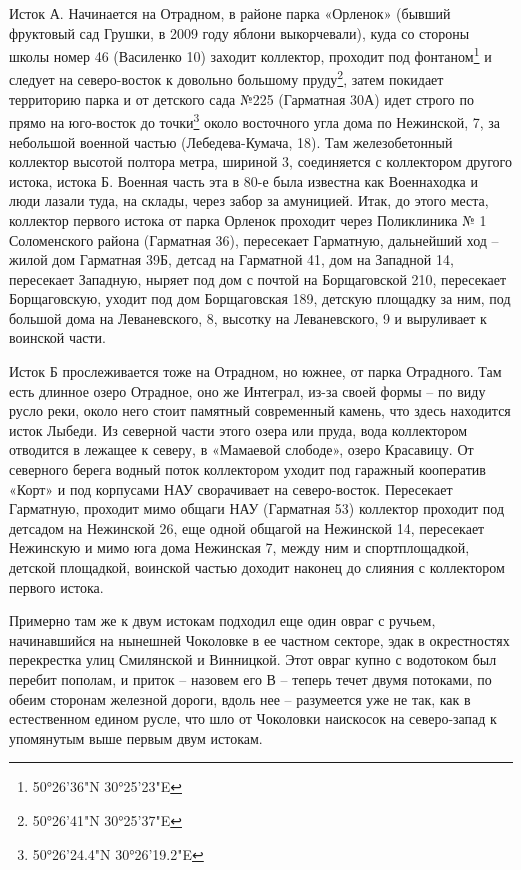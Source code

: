 Исток А. Начинается на Отрадном, в районе парка «Орленок» (бывший фруктовый сад Грушки, в 2009 году яблони выкорчевали), куда со стороны школы номер 46 (Василенко 10) заходит коллектор, проходит под фонтаном\footnote{50°26'36"N 30°25'23"E} и следует на северо-восток к довольно большому пруду\footnote{50°26'41"N 30°25'37"E}, затем покидает территорию парка и от детского сада №225 (Гарматная 30А) идет строго по прямо на юго-восток до точки\footnote{50°26'24.4"N 30°26'19.2"E} около восточного угла дома по Нежинской, 7, за небольшой военной частью (Лебедева-Кумача, 18). Там железобетонный коллектор высотой полтора метра, шириной 3, соединяется с коллектором другого истока, истока Б. Военная часть эта в 80-е была известна как Военнаходка и люди лазали туда, на склады, через забор за амуницией. Итак, до этого места, коллектор первого истока от парка Орленок проходит через Поликлиника № 1 Соломенского района (Гарматная 36), пересекает Гарматную, дальнейший ход – жилой дом Гарматная 39Б, детсад на Гарматной 41, дом на Западной 14, пересекает Западную, ныряет под дом с почтой на Борщаговской 210, пересекает Борщаговскую, уходит под дом Борщаговская 189, детскую площадку за ним, под большой дома на Леваневского, 8, высотку на Леваневского, 9 и выруливает к воинской части.  

Исток Б прослеживается тоже на Отрадном, но южнее, от парка Отрадного. Там есть длинное озеро Отрадное, оно же Интеграл, из-за своей формы – по виду русло реки, около него стоит памятный современный камень, что здесь находится исток Лыбеди. Из северной части этого озера или пруда, вода коллектором отводится в лежащее к северу, в «Мамаевой слободе», озеро Красавицу. От северного берега водный поток коллектором уходит под гаражный кооператив «Корт» и под корпусами НАУ сворачивает на северо-восток. Пересекает Гарматную, проходит мимо общаги НАУ (Гарматная 53) коллектор проходит под детсадом на Нежинской 26, еще одной общагой на Нежинской 14, пересекает Нежинскую и мимо юга дома Нежинская 7, между ним и спортплощадкой, детской площадкой, воинской частью доходит наконец до слияния с коллектором первого истока.

Примерно там же к двум истокам подходил еще один овраг с ручьем, начинавшийся на нынешней Чоколовке в ее частном секторе, эдак в окрестностях перекрестка улиц Смилянской и Винницкой. Этот овраг купно с водотоком был перебит пополам, и приток – назовем его В – теперь течет двумя потоками, по обеим сторонам железной дороги, вдоль нее – разумеется уже не так, как в естественном едином русле, что шло от Чоколовки наискосок на северо-запад к упомянутым выше первым двум истокам. 

